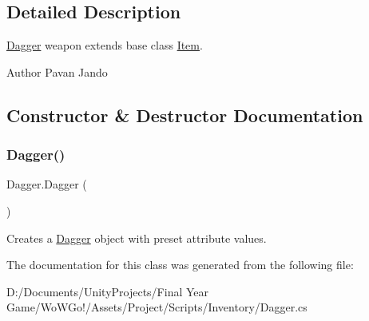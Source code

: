 \subsection{Detailed Description}
\mbox{\hyperlink{class_dagger}{Dagger}} weapon extends base class \mbox{\hyperlink{class_item}{Item}}. 

\begin{DoxyAuthor}{Author}
Pavan Jando
\end{DoxyAuthor}


\subsection{Constructor \& Destructor Documentation}
\mbox{\label{class_dagger_ab5dedddec32dcbfc2111820e3fda4e7f}} 
\subsubsection{\texorpdfstring{Dagger()}{Dagger()}}
{\footnotesize\ttfamily Dagger.\+Dagger (\begin{DoxyParamCaption}{ }\end{DoxyParamCaption})}



Creates a \mbox{\hyperlink{class_dagger}{Dagger}} object with preset attribute values. 



The documentation for this class was generated from the following file\+:\begin{DoxyCompactItemize}
\item 
D\+:/\+Documents/\+Unity\+Projects/\+Final Year Game/\+Wo\+W\+Go!/\+Assets/\+Project/\+Scripts/\+Inventory/Dagger.\+cs\end{DoxyCompactItemize}
